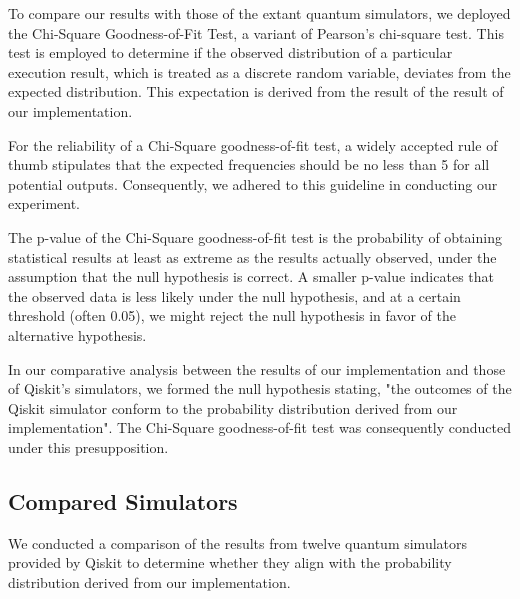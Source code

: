 \documentclass[10pt,a4paper]{article}
\newcommand{\<}{\langle}
\renewcommand{\>}{\rangle}
\begin{document}
To compare our results with those of the extant quantum simulators, we deployed the Chi-Square
Goodness-of-Fit Test, a variant of Pearson's chi-square test. This test is employed to determine if
the observed distribution of a particular execution result, which is treated as a discrete random
variable, deviates from the expected distribution. This expectation is derived from the result of
the result of our implementation.

For the reliability of a Chi-Square goodness-of-fit test, a widely accepted rule of thumb stipulates
that the expected frequencies should be no less than 5 for all potential outputs. Consequently, we
adhered to this guideline in conducting our experiment.

The p-value of the Chi-Square goodness-of-fit test is the probability of obtaining statistical results at
least as extreme as the results actually observed, under the assumption that the null hypothesis is
correct. A smaller p-value indicates that the observed data is less likely under the null
hypothesis, and at a certain threshold (often 0.05), we might reject the null hypothesis in favor of
the alternative hypothesis.

In our comparative analysis between the results of our implementation and those of Qiskit's
simulators, we formed the null hypothesis stating, "the outcomes of the Qiskit simulator conform to
the probability distribution derived from our implementation". The Chi-Square goodness-of-fit test
was consequently conducted under this presupposition.

\subsection{Compared Simulators}

We conducted a comparison of the results from twelve quantum simulators provided by Qiskit to
determine whether they align with the probability distribution derived from our implementation.
\end{document}

